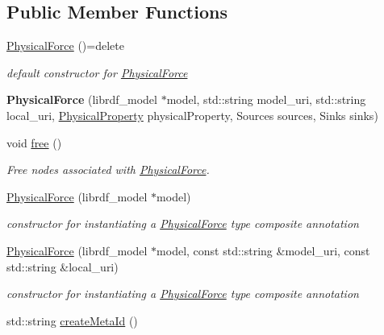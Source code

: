 \subsection*{Public Member Functions}
\begin{DoxyCompactItemize}
\item 
\hyperlink{classomexmeta_1_1PhysicalForce_ad5b43ea5489891c45f5ebc4c9b62e44e}{Physical\+Force} ()=delete
\begin{DoxyCompactList}\small\item\em default constructor for \hyperlink{classomexmeta_1_1PhysicalForce}{Physical\+Force} \end{DoxyCompactList}\item 
\mbox{\label{classomexmeta_1_1PhysicalForce_a8761d703a67c6dc81b4a71b90391b20f}} 
{\bfseries Physical\+Force} (librdf\+\_\+model $\ast$model, std\+::string model\+\_\+uri, std\+::string local\+\_\+uri, \hyperlink{classomexmeta_1_1PhysicalProperty}{Physical\+Property} physical\+Property, Sources sources, Sinks sinks)
\item 
void \hyperlink{classomexmeta_1_1PhysicalForce_a41cd6c9904f3287bb8cbbab2b9d2ada3}{free} ()
\begin{DoxyCompactList}\small\item\em Free nodes associated with \hyperlink{classomexmeta_1_1PhysicalForce}{Physical\+Force}. \end{DoxyCompactList}\item 
\hyperlink{classomexmeta_1_1PhysicalForce_a673e6810fe969bcd087ab88c62e5e041}{Physical\+Force} (librdf\+\_\+model $\ast$model)
\begin{DoxyCompactList}\small\item\em constructor for instantiating a \hyperlink{classomexmeta_1_1PhysicalForce}{Physical\+Force} type composite annotation \end{DoxyCompactList}\item 
\hyperlink{classomexmeta_1_1PhysicalForce_a2ff9aecd73a5356be701d8ba7e9bf71c}{Physical\+Force} (librdf\+\_\+model $\ast$model, const std\+::string \&model\+\_\+uri, const std\+::string \&local\+\_\+uri)
\begin{DoxyCompactList}\small\item\em constructor for instantiating a \hyperlink{classomexmeta_1_1PhysicalForce}{Physical\+Force} type composite annotation \end{DoxyCompactList}\item 
std\+::string \hyperlink{classomexmeta_1_1PhysicalForce_ae0a9ec4689b4765d985ab8f7a8878f38}{create\+Meta\+Id} ()

\end{DoxyCompactItemize}
